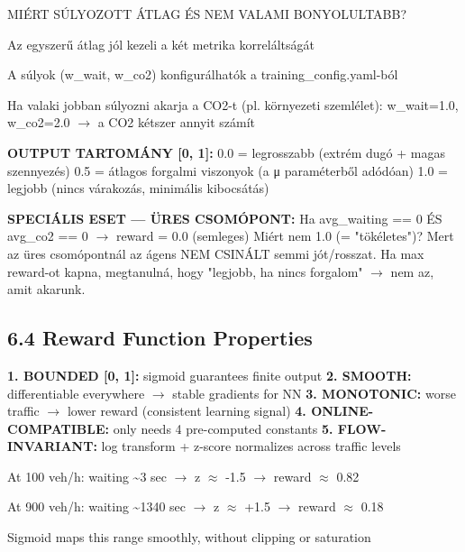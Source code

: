 \documentclass[11pt,a4paper]{article}
\begin{document}
MIÉRT SÚLYOZOTT ÁTLAG ÉS NEM VALAMI BONYOLULTABB?
\par\noindent\hspace*{1em}\textbullet{} Az egyszerű átlag jól kezeli a két metrika korreláltságát
\par\noindent\hspace*{1em}\textbullet{} A súlyok (w\_wait, w\_co2) konfigurálhatók a training\_config.yaml-ból
\par\noindent\hspace*{1em}\textbullet{} Ha valaki jobban súlyozni akarja a CO2-t (pl. környezeti szemlélet):
w\_wait=1.0, w\_co2=2.0 $\rightarrow$ a CO2 kétszer annyit számít

\textbf{OUTPUT TARTOMÁNY [0, 1]:}
0.0 = legrosszabb (extrém dugó + magas szennyezés)
0.5 = átlagos forgalmi viszonyok (a μ paraméterből adódóan)
1.0 = legjobb (nincs várakozás, minimális kibocsátás)

\textbf{SPECIÁLIS ESET — ÜRES CSOMÓPONT:}
Ha avg\_waiting == 0 ÉS avg\_co2 == 0 $\rightarrow$ reward = 0.0 (semleges)
Miért nem 1.0 (= "tökéletes")? Mert az üres csomópontnál az ágens
NEM CSINÁLT semmi jót/rosszat. Ha max reward-ot kapna, megtanulná,
hogy "legjobb, ha nincs forgalom" $\rightarrow$ nem az, amit akarunk.

\subsection*{6.4 Reward Function Properties}
\textbf{1. BOUNDED [0, 1]:} sigmoid guarantees finite output
\textbf{2. SMOOTH:} differentiable everywhere $\rightarrow$ stable gradients for NN
\textbf{3. MONOTONIC:} worse traffic $\rightarrow$ lower reward (consistent learning signal)
\textbf{4. ONLINE-COMPATIBLE:} only needs 4 pre-computed constants
\textbf{5. FLOW-INVARIANT:} log transform + z-score normalizes across traffic levels
\par\noindent\hspace*{1em}\textbullet{} At 100 veh/h: waiting \textasciitilde{}3 sec $\rightarrow$ z $\approx$ -1.5 $\rightarrow$ reward $\approx$ 0.82
\par\noindent\hspace*{1em}\textbullet{} At 900 veh/h: waiting \textasciitilde{}1340 sec $\rightarrow$ z $\approx$ +1.5 $\rightarrow$ reward $\approx$ 0.18
\par\noindent\hspace*{1em}\textbullet{} Sigmoid maps this range smoothly, without clipping or saturation
\end{document}
